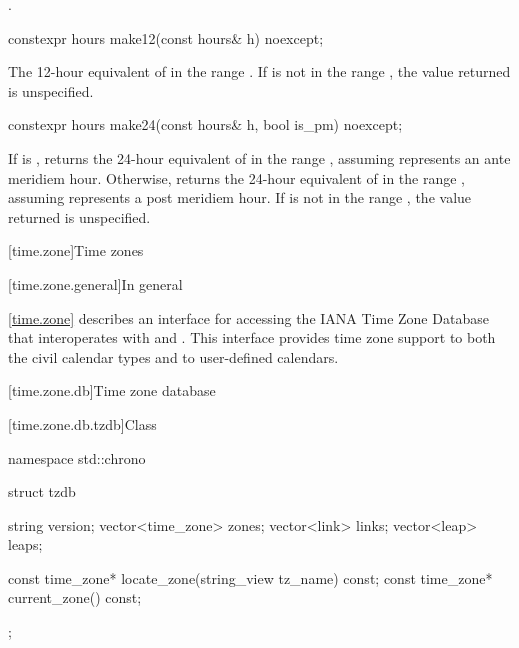 \begin{itemdescr}
\pnum
\returns
{}.
\end{itemdescr}

%
\begin{itemdecl}
constexpr hours make12(const hours& h) noexcept;
\end{itemdecl}

\begin{itemdescr}
\pnum
\returns
The 12-hour equivalent of  in the range .
If  is not in the range ,
the value returned is unspecified.
\end{itemdescr}

%
\begin{itemdecl}
constexpr hours make24(const hours& h, bool is_pm) noexcept;
\end{itemdecl}

\begin{itemdescr}
\pnum
\returns
If  is ,
returns the 24-hour equivalent of 
in the range ,
assuming  represents an ante meridiem hour.
Otherwise,
returns the 24-hour equivalent of 
in the range ,
assuming  represents a post meridiem hour.
If  is not in the range ,
the value returned is unspecified.
\end{itemdescr}

[time.zone]{Time zones}

[time.zone.general]{In general}

\pnum
\ref{time.zone} describes an interface for accessing
the IANA Time Zone Database
that interoperates with  and .
This interface provides time zone support to
both the civil calendar types
and to user-defined calendars.

[time.zone.db]{Time zone database}

[time.zone.db.tzdb]{Class }

\begin{codeblock}
namespace std::chrono {
  struct tzdb {
    string            version;
    vector<time_zone> zones;
    vector<link>      links;
    vector<leap>      leaps;

    const time_zone* locate_zone(string_view tz_name) const;
    const time_zone* current_zone() const;
  };
}
\end{codeblock}

